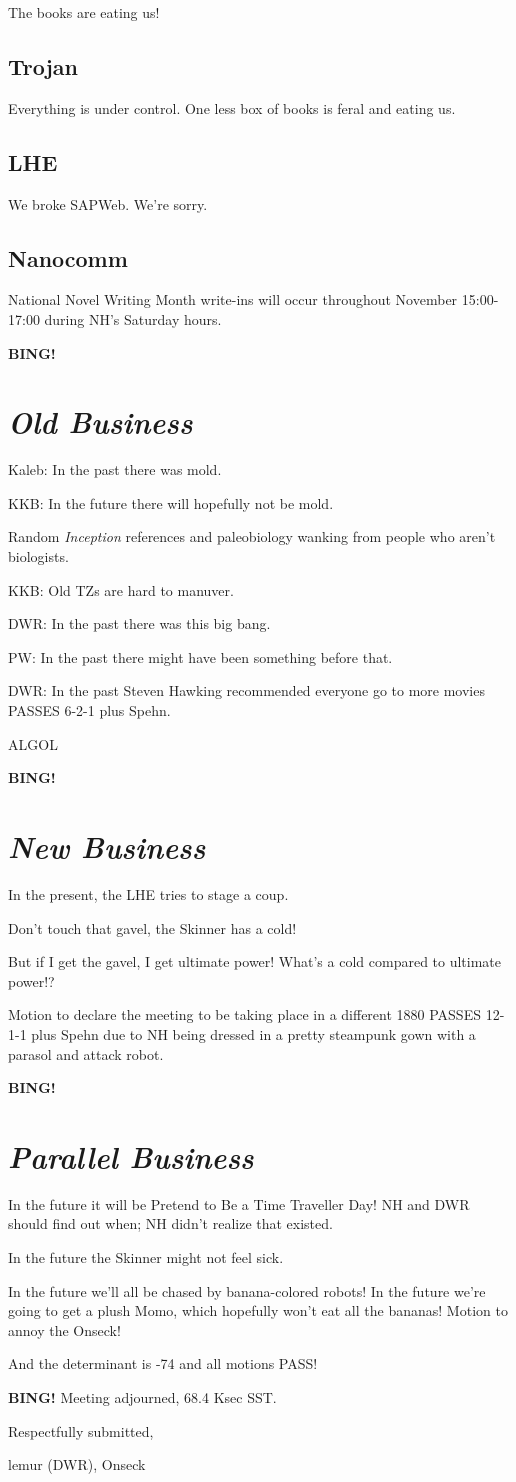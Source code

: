 \documentclass[10pt]{article}
\newcommand{\bing}{{\bf BING!} }
\newcommand{\goto}[1]{\bing \vskip 12pt \section*{{\em{#1}}}}
\newcommand{\ps}{ plus Spehn\xspace}
\newcommand{\onseck}{lemur (DWR), Onseck}
\begin{document}
The books are eating us!

\subsection*{Trojan}

Everything is under control.  One less box of books is feral and
eating us.

\subsection*{LHE}

We broke SAPWeb.  We're sorry.

\subsection*{Nanocomm}

National Novel Writing Month write-ins will occur throughout
November 15:00-17:00 during NH's Saturday hours. 

\goto{Old Business}

Kaleb: In the past there was mold.

KKB: In the future there will hopefully not be mold.

Random \emph{Inception} references and paleobiology wanking
from people who aren't biologists.

KKB: Old TZs are hard to manuver.

DWR: In the past there was this big bang.

PW: In the past there might have been something before that.

DWR: In the past Steven Hawking recommended everyone go to
more movies PASSES 6-2-1\ps.

ALGOL

\goto{New Business}

In the present, the LHE tries to stage a coup.

Don't touch that gavel, the Skinner has a cold!

But if I get the gavel, I get ultimate power!  What's a cold
compared to ultimate power!?

Motion to declare the meeting to be taking place in a different
1880 PASSES 12-1-1\ps due to NH being dressed in a pretty
steampunk gown with a parasol and attack robot.

\goto{Parallel Business}

In the future it will be Pretend to Be a Time Traveller Day!
NH and DWR should find out when; NH didn't realize that existed.

In the future the Skinner might not feel sick.

In the future we'll all be chased by banana-colored robots!
In the future we're going to get a plush Momo, which hopefully won't
eat all the bananas!
Motion to annoy the Onseck!

And the determinant is -74 and all motions PASS!

\bing
\noindent
Meeting adjourned, 68.4 Ksec SST.

\vspace{18pt}

\centerline{Respectfully submitted,}
\centerline{\onseck}
\end{document}
